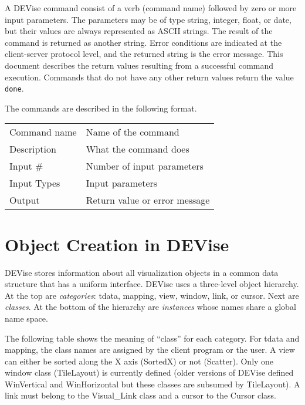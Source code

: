 A DEVise command consist of a verb (command name) followed by zero or
more input parameters. The parameters may be of type string, integer,
float, or date, but their values are always represented as ASCII
strings. The result of the command is returned as another
string. Error conditions are indicated at the client-server protocol
level, and the returned string is the error message. This document
describes the return values resulting from a successful command
execution. Commands that do not have any other return values return
the value {\tt done}.

The commands are described in the following format.

\bigskip

\noindent
\begin{tabular}{l|p{5in}}
\hline
Command name & Name of the command \\
Description  & What the command does \\
Input \#     & Number of input parameters \\
Input Types  & Input parameters \\
Output       & Return value or error message \\
\hline
\end{tabular}

\section{Object Creation in DEVise\protect\label{objcreate}}

DEVise stores information about all visualization objects in a common
data structure that has a uniform interface. DEVise uses a three-level
object hierarchy. At the top are {\em categories}: tdata, mapping,
view, window, link, or cursor. Next are {\em classes}. At the bottom
of the hierarchy are {\em instances} whose names share a global name
space.

The following table shows the meaning of ``class'' for each category.
For tdata and mapping, the class names are assigned by the client
program or the user. A view can either be sorted along the X axis
(SortedX) or not (Scatter). Only one window class (TileLayout) is
currently defined (older versions of DEVise defined WinVertical and
WinHorizontal but these classes are subsumed by TileLayout). A link
must belong to the Visual\_Link class and a cursor to the Cursor
class.

\bigskip

